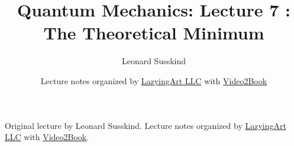 \documentclass[11pt,oneside]{book}
\begin{document}
\frontmatter
\title{Quantum Mechanics: Lecture 7 : The Theoretical Minimum}
\author{Leonard Susskind}
\date{Lecture notes organized by \href{https://lazying.art}{LazyingArt LLC} with \href{https://github.com/lachlanchen/Video2Book}{Video2Book}}
\maketitle
\begin{center}
\small Original lecture by Leonard Susskind. Lecture notes organized by \href{https://lazying.art}{LazyingArt LLC} with \href{https://github.com/lachlanchen/Video2Book}{Video2Book}.
\end{center}
\clearpage
\mainmatter

\end{document}
